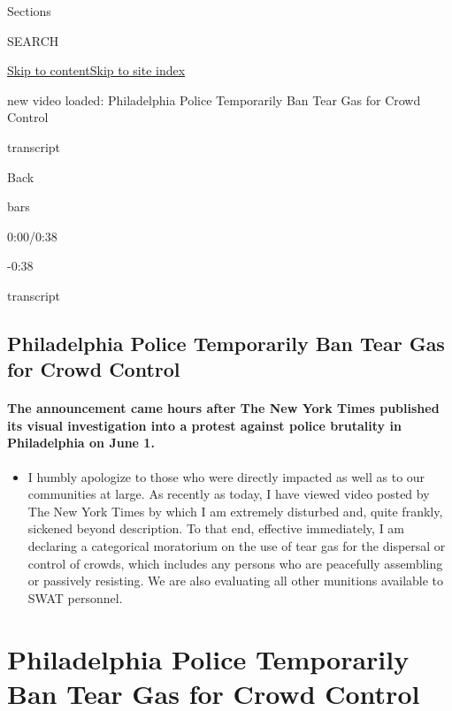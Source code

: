 Sections

SEARCH

\protect\hyperlink{site-content}{Skip to
content}\protect\hyperlink{site-index}{Skip to site index}

new video loaded: Philadelphia Police Temporarily Ban Tear Gas for Crowd
Control

transcript

Back

bars

0:00/0:38

-0:38

transcript

\hypertarget{philadelphia-police-temporarily-ban-tear-gas-for-crowd-control}{%
\subsection{Philadelphia Police Temporarily Ban Tear Gas for Crowd
Control}\label{philadelphia-police-temporarily-ban-tear-gas-for-crowd-control}}

\hypertarget{the-announcement-came-hours-after-the-new-york-times-published-its-visual-investigation-into-a-protest-against-police-brutality-in-philadelphia-on-june-1}{%
\paragraph{The announcement came hours after The New York Times
published its visual investigation into a protest against police
brutality in Philadelphia on June
1.}\label{the-announcement-came-hours-after-the-new-york-times-published-its-visual-investigation-into-a-protest-against-police-brutality-in-philadelphia-on-june-1}}

\begin{itemize}
\tightlist
\item
  I humbly apologize to those who were directly impacted as well as to
  our communities at large. As recently as today, I have viewed video
  posted by The New York Times by which I am extremely disturbed and,
  quite frankly, sickened beyond description. To that end, effective
  immediately, I am declaring a categorical moratorium on the use of
  tear gas for the dispersal or control of crowds, which includes any
  persons who are peacefully assembling or passively resisting. We are
  also evaluating all other munitions available to SWAT personnel.
\end{itemize}

\hypertarget{philadelphia-police-temporarily-ban-tear-gas-for-crowd-control-1}{%
\section{Philadelphia Police Temporarily Ban Tear Gas for Crowd
Control}\label{philadelphia-police-temporarily-ban-tear-gas-for-crowd-control-1}}

